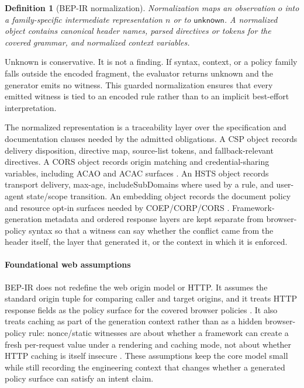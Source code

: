 \documentclass[10pt,conference]{IEEEtran}
\newtheorem{definition}{Definition}
\newcommand{\bep}{BEP-IR}
\newcommand{\unknown}{\mathsf{unknown}}
\begin{document}
\begin{definition}[BEP-IR normalization]
Normalization maps an observation $o$ into a family-specific intermediate representation $n$ or to $\unknown$. A normalized object contains canonical header names, parsed directives or tokens for the covered grammar, and normalized context variables.
\end{definition}

Unknown is conservative. It is not a finding. If syntax, context, or a policy family falls outside the encoded fragment, the evaluator returns unknown and the generator emits no witness. This guarded normalization ensures that every emitted witness is tied to an encoded rule rather than to an implicit best-effort interpretation.

The normalized representation is a traceability layer over the specification and documentation clauses needed by the admitted obligations. A CSP object records delivery disposition, directive map, source-list tokens, and fallback-relevant directives. A CORS object records origin matching and credential-sharing variables, including ACAO and ACAC surfaces \cite{whatwg_fetch_2026}. An HSTS object records transport delivery, max-age, includeSubDomains where used by a rule, and user-agent state/scope transition. An embedding object records the document policy and resource opt-in surfaces needed by COEP/CORP/CORS \cite{w3c_corp_2026,mdn_corp_header_2026}. Framework-generation metadata and ordered response layers are kept separate from browser-policy syntax so that a witness can say whether the conflict came from the header itself, the layer that generated it, or the context in which it is enforced.



\paragraph{Foundational web assumptions}

\bep{} does not redefine the web origin model or HTTP. It assumes the standard origin tuple for comparing caller and target origins, and it treats HTTP response fields as the policy surface for the covered browser policies \cite{rfc6454_origin,rfc9110_http_semantics}. It also treats caching as part of the generation context rather than as a hidden browser-policy rule: nonce/static witnesses are about whether a framework can create a fresh per-request value under a rendering and caching mode, not about whether HTTP caching is itself insecure \cite{rfc9111_http_caching}. These assumptions keep the core model small while still recording the engineering context that changes whether a generated policy surface can satisfy an intent claim.
\end{document}
